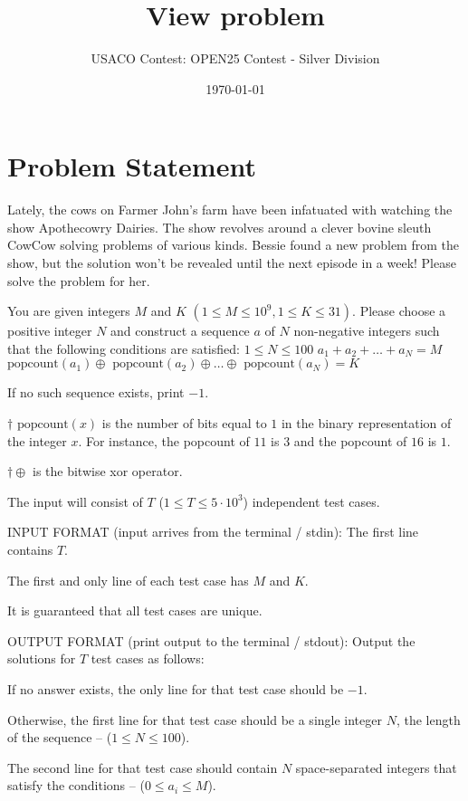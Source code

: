 \documentclass[12pt]{article}
\title{View problem}
\author{USACO Contest: OPEN25 Contest - Silver Division}
\date{\today}
\begin{document}
\maketitle

\section*{Problem Statement}


Lately, the cows on Farmer John's farm have been infatuated with watching the
show Apothecowry Dairies. The show revolves around a clever bovine sleuth CowCow
solving problems of various kinds. Bessie found a new problem from the show, but
the solution won't be revealed until the next episode in a week! Please solve
the problem for her.

You are given integers $M$ and $K$ $(1 \leq M \leq 10 ^ 9, 1 \leq K \leq 31)$.
Please choose a positive integer $N$ and construct a sequence $a$ of $N$
non-negative integers such that the following conditions are satisfied:
 $1 \le N \le 100$  $a_1 + a_2 + \dots + a_N = M$ 
$\text{popcount}(a_1) \oplus \text{ popcount}(a_2) \oplus \dots \oplus \text{ popcount}(a_N) = K$

If no such sequence exists, print $-1$.

$\dagger \text{ popcount}(x)$ is the number of bits equal to $1$ in the binary
representation of the integer $x$. For instance, the popcount of $11$ is $3$ and
the popcount of $16$ is $1$.

$\dagger \oplus$ is the bitwise xor operator.

The input will consist of $T$ ($1 \le T \le 5 \cdot 10^3$) independent test
cases.

INPUT FORMAT (input arrives from the terminal / stdin):
The first line contains $T$.

The first and only line of each test case has $M$ and $K$. 

It is guaranteed that all test cases are unique.


OUTPUT FORMAT (print output to the terminal / stdout):
Output the solutions for $T$ test cases as follows:

If no answer exists, the only line for that test case should be $-1$.

Otherwise, the first line for that test case should be a single integer $N$, the
length of the sequence -- ($1 \le  N \le 100$).

The second line for that test case should contain $N$ space-separated integers
that satisfy the conditions -- ($0 \le a_i \le M$).
\end{document}
